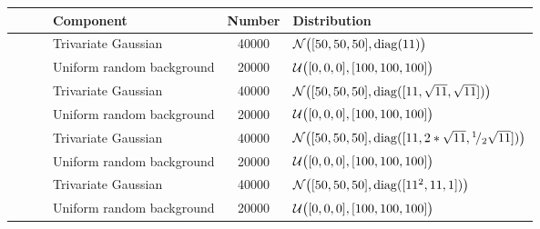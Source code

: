\small
{}
\begin{tabular}{@{}cclSl@{}}
\toprule
				&~						& Component					& {Number} 	& Distribution\\
\midrule
\ferdosiOne 	&\legendComponentOne	& Trivariate Gaussian 		& 40000		& $\mathcal{N}\big([50, 50, 50], \operatorname{diag}(11)\big)$\\
~ 				&\legendComponentNoise	& Uniform random background	& 20000		& $\mathcal{U}\big([0, 0, 0], [100, 100, 100]\big)$\\
\hline
\baakmanOne		&\legendComponentOne	& Trivariate Gaussian 		& 40000		& $\mathcal{N}\big([50, 50, 50], \operatorname{diag}([11, \sqrt{11}, \sqrt{11}])\big)$\\
~ 				&\legendComponentNoise	& Uniform random background	& 20000		& $\mathcal{U}\big([0, 0, 0], [100, 100, 100]\big)$\\
\hline
\baakmanFour	&\legendComponentOne	& Trivariate Gaussian 		& 40000		& $\mathcal{N}\big([50, 50, 50], \operatorname{diag}([11, 2 * \sqrt{11}, {}^{1}\!/_{2} \sqrt{11}])\big)$\\
~ 				&\legendComponentNoise	& Uniform random background	& 20000		& $\mathcal{U}\big([0, 0, 0], [100, 100, 100]\big)$\\
\hline
\baakmanFive	&\legendComponentOne	& Trivariate Gaussian 		& 40000		& $\mathcal{N}\big([50, 50, 50], \operatorname{diag}([11^2, 11, 1])\big)$\\
~ 				&\legendComponentNoise	& Uniform random background	& 20000		& $\mathcal{U}\big([0, 0, 0], [100, 100, 100]\big)$\\
\bottomrule
\end{tabular}